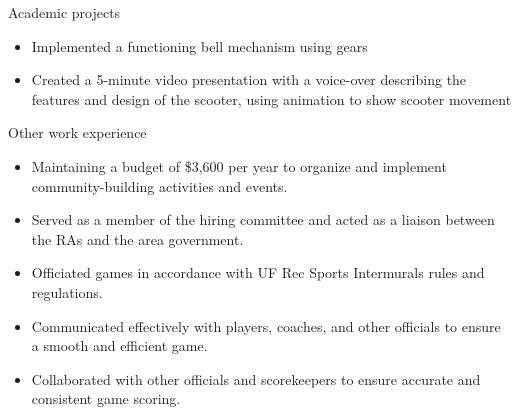 \documentclass{resume} %
\begin{document}
\begin{workSection}{Academic projects}
    \customItem[
     title = Scooter,
     organization = Computer-Aided Design,
     duration = Fall 2022,
     keyHighlight = Along with my project partner designed and modeled a scooter using SolidWorks with 35 individual parts
     ]
      \begin{itemize}
        \vspace{-0.5em}
        \itemsep -6pt {} 
        \item Implemented a functioning bell mechanism using gears
        \item Created a 5-minute video presentation with a voice-over describing the features and design of the scooter{,} using animation to show scooter movement
        \end{itemize}
\end{workSection}

\begin{workSection}{Other work experience}
     \experienceItem[
        company=University of Florida Residential Housing,
        position=Resident Assistant \& Desk Assistant,
        duration=March 2022 – Present
     ]
     \begin{itemize}
        \vspace{-0.5em}
        \itemsep -6pt {} 
        \item Maintaining a budget of \$3,600 per year to organize and implement community-building activities and events. 
        \item Served as a member of the hiring committee and acted as a liaison between the RAs and the area government.
     \end{itemize}
   
    \experienceItem[
        company=University of Florida Sports Programs,
        position=Official \& Scorekeeper,
        duration=January 2022 – Present
        ]
        \begin{itemize}
        \vspace{-0.5em}
        \itemsep -6pt {} 
        \item Officiated games in accordance with UF Rec Sports Intermurals rules and regulations.
        \item Communicated effectively with players, coaches, and other officials to ensure a smooth and efficient game.
        \item Collaborated with other officials and scorekeepers to ensure accurate and consistent game scoring.
     \end{itemize}
\end{workSection}
\end{document}
